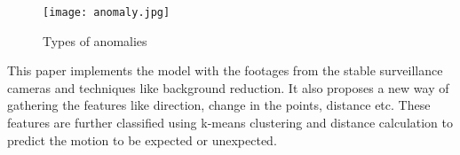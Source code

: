 \begin{figure}[h!]
	\center\texttt{[image: anomaly.jpg]}
	\caption{Types of anomalies ~\cite{bansod2020crowd} }
	\label{fig:anomaly}
\end{figure}

This paper implements the model with the footages from the stable surveillance cameras and techniques like background reduction. It also proposes a new way of gathering the features like direction, change in the points, distance etc. These features are further classified using k-means clustering and distance calculation to predict the motion to be expected or unexpected.



 

 